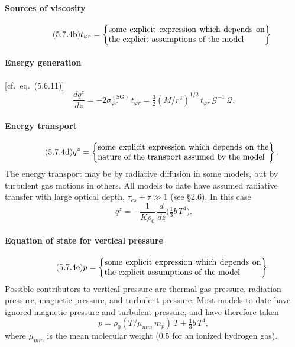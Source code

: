 \paragraph{Sources of viscosity}
%
\begin{equation}
\tag{5.7.4b}
t_{\varphi r}
= \left\{
    \begin{minipage}{0.55\columnwidth}
    some explicit expression which depends on
    the explicit assumptions of the model
    \end{minipage}
  \right\}
\end{equation}

\paragraph{Energy generation}
[cf.\ eq.~(5.6.11)]
%
\begin{equation}
\tag{5.7.4c}
\frac{dq^z}{dz}
= -2\sigma^{(\mathrm{SG})}_{\varphi r}\, t_{\varphi r}
= \tfrac{3}{2}(M/r^3)^{1/2}\, t_{\varphi r}\,
  \mathscr{G}^{-1}\,\mathscr{Q}.
\end{equation}

\paragraph{Energy transport}
%
\begin{equation}
\tag{5.7.4d}
q^z
= \left\{
    \begin{minipage}{0.6\columnwidth}
    some explicit expression which depends on the
    nature of the transport assumed by the model
    \end{minipage}
  \right\}.
\end{equation}
%
The energy transport may be by radiative diffusion in some models, but by
turbulent gas motions in others.  All models to date have assumed radiative
transfer with large optical depth, $\tau_{es} + \tau \gg 1$ (see \S2.6).  In this case
%
\begin{equation}
\tag{5.7.4d$'$}
q^z = -\frac{1}{K\rho_0}\,\frac{d}{dz}\bigl(\tfrac{1}{3}b\,T^4\bigr).
\end{equation}

\paragraph{Equation of state for vertical pressure}
%
\begin{equation}
\tag{5.7.4e}
p
= \left\{
    \begin{minipage}{0.55\columnwidth}
    some explicit expression which depends on
    the explicit assumptions of the model
    \end{minipage}
  \right\}
\end{equation}
%
Possible contributors to vertical pressure are thermal gas pressure, radiation
pressure, magnetic pressure, and turbulent pressure.  Most models to date have
ignored magnetic pressure and turbulent pressure, and have therefore taken
%
\begin{equation}
\tag{5.7.4e$'$}
p = \rho_0 (T/\mu_{mm}\, m_p)\, T + \tfrac{1}{3} b\, T^4,
\end{equation}
%
where $\mu_{mm}$ is the mean molecular weight (0.5 for an ionized hydrogen gas).

